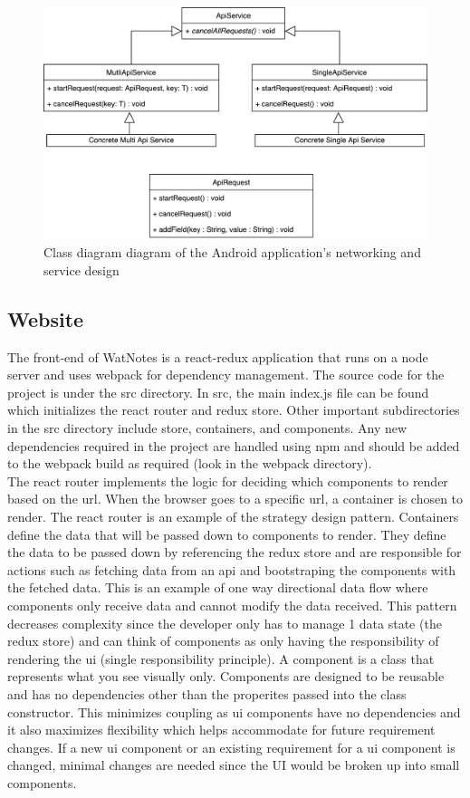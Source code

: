 \documentclass[12pt]{article}
\begin{document}
    \begin{figure}[H]
      \includegraphics[width=\textwidth]{assets/android-network-class.pdf}
      \caption{Class diagram diagram of the Android application's networking and service design}
    \end{figure}

  \subsection{Website}
  The front-end of WatNotes is a react-redux application that runs on a node server and uses webpack for dependency management. The source code for the project is under the src directory. In src, the main index.js file can be found which initializes the react router and redux store. Other important subdirectories in the src directory include store, containers, and components. Any new dependencies required in the project are handled using npm and should be added to the webpack build as required (look in the webpack directory).\\

  The react router implements the logic for deciding which components to render based on the url. When the browser goes to a specific url, a container is chosen to render. The react router is an example of the strategy design pattern. Containers define the data that will be passed down to components to render. They define the data to be passed down by referencing the redux store and are responsible for actions such as fetching data from an api and bootstraping the components with the fetched data. This is an example of one way directional data flow where components only receive data and cannot modify the data received. This pattern decreases complexity since the developer only has to manage 1 data state (the redux store) and can think of components as only having the responsibility of rendering the ui (single responsibility principle). A component is a class that represents what you see visually only. Components are designed to be reusable and has no dependencies other than the properites passed into the class constructor. This minimizes coupling as ui components have no dependencies and it also maximizes flexibility which helps accommodate for future requirement changes. If a new ui component or an existing requirement for a ui component is changed, minimal changes are needed since the UI would be broken up into small components.\\
\end{document}
